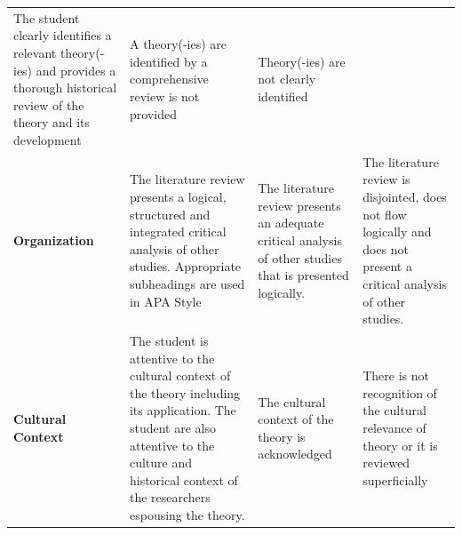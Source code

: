 \documentclass[
  openany]{book}
\begin{document}
\begin{longtable}[]{@{}llll@{}}
\begin{minipage}[t]{0.22\columnwidth}
The student clearly identifies a relevant theory(-ies) and provides a thorough historical review of the theory and its development\strut
\end{minipage} & \begin{minipage}[t]{0.22\columnwidth}\raggedright
A theory(-ies) are identified by a comprehensive review is not provided\strut
\end{minipage} & \begin{minipage}[t]{0.22\columnwidth}\raggedright
Theory(-ies) are not clearly identified\strut
\end{minipage}\tabularnewline
\begin{minipage}[t]{0.22\columnwidth}\raggedright
\textbf{Organization}\strut
\end{minipage} & \begin{minipage}[t]{0.22\columnwidth}\raggedright
The literature review presents a logical, structured and integrated critical analysis of other studies. Appropriate subheadings are used in APA Style\strut
\end{minipage} & \begin{minipage}[t]{0.22\columnwidth}\raggedright
The literature review presents an adequate critical analysis of other studies that is presented logically.\strut
\end{minipage} & \begin{minipage}[t]{0.22\columnwidth}\raggedright
The literature review is disjointed, does not flow logically and does not present a critical analysis of other studies.\strut
\end{minipage}\tabularnewline
\begin{minipage}[t]{0.22\columnwidth}\raggedright
\textbf{Cultural Context}\strut
\end{minipage} & \begin{minipage}[t]{0.22\columnwidth}\raggedright
The student is attentive to the cultural context of the theory including its application. The student are also attentive to the culture and historical context of the researchers espousing the theory.\strut
\end{minipage} & \begin{minipage}[t]{0.22\columnwidth}\raggedright
The cultural context of the theory is acknowledged\strut
\end{minipage} & \begin{minipage}[t]{0.22\columnwidth}\raggedright
There is not recognition of the cultural relevance of theory or it is reviewed superficially\strut
\end{minipage}\tabularnewline

\end{longtable}
\end{document}

